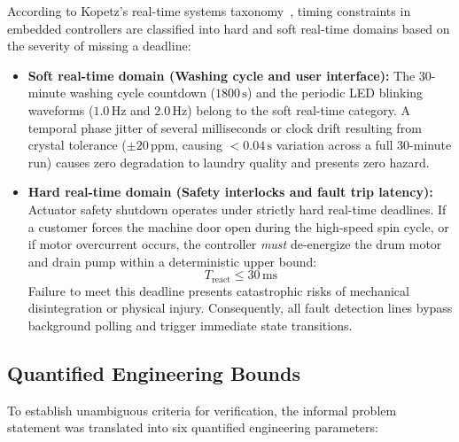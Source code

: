 According to Kopetz's real-time systems taxonomy~\cite{kopetz}, timing constraints in embedded controllers are
classified into hard and soft real-time domains based on the severity of missing a deadline:

\begin{itemize}
  \item \textbf{Soft real-time domain (Washing cycle and user interface):}
    The 30-minute washing cycle countdown ($1800\,\text{s}$) and the periodic LED blinking waveforms
    ($1.0\,\text{Hz}$ and $2.0\,\text{Hz}$) belong to the soft real-time category. A temporal phase jitter of
    several milliseconds or clock drift resulting from crystal tolerance ($\pm 20\,\text{ppm}$, causing
    $< 0.04\,\text{s}$ variation across a full 30-minute run) causes zero degradation to laundry quality and
    presents zero hazard.
  \item \textbf{Hard real-time domain (Safety interlocks and fault trip latency):}
    Actuator safety shutdown operates under strictly hard real-time deadlines. If a customer forces the machine
    door open during the high-speed spin cycle, or if motor overcurrent occurs, the controller \emph{must}
    de-energize the drum motor and drain pump within a deterministic upper bound:
    \begin{equation}
      T_{\text{react}} \le 30\,\text{ms}
    \end{equation}
    Failure to meet this deadline presents catastrophic risks of mechanical disintegration or physical injury.
    Consequently, all fault detection lines bypass background polling and trigger immediate state transitions.
\end{itemize}

\subsection{Quantified Engineering Bounds}
\label{sec:bounds}

To establish unambiguous criteria for verification, the informal problem statement was translated into six
quantified engineering parameters:

